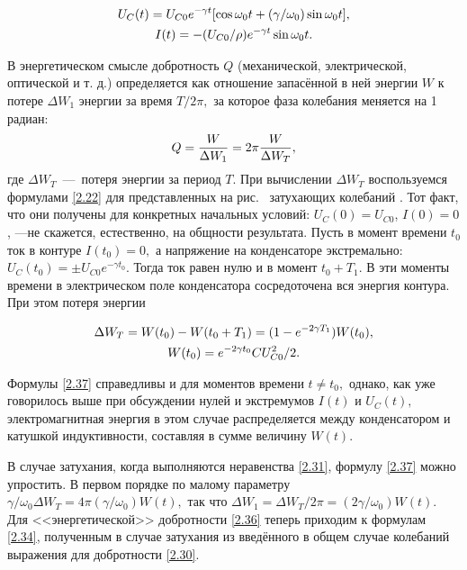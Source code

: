 \begin{equation}
	\eqmark{2.35}
		\begin{gathered}[c]
			U_C(t)=U_{C0}e^{-\gamma t}[\cos\omega_0t+(\gamma/\omega_0)\sin\omega_0t], \\
			I(t)=-(U_{C0}/\rho)e^{-\gamma t}\sin\omega_0 t.
		\end{gathered}
\end{equation}

В энергетическом смысле добротность $Q$  (механической, электрической, оптической и т. д.) определяется как отношение запасённой в ней энергии $W$ к потере $\Delta W_1$ энергии за время $T/2\pi,$ за которое фаза колебания меняется на 1 радиан:
\begin{equation}\eqmark{2.36}
Q=\dfrac{W}{\Delta W_1}=2\pi\dfrac{W}{\Delta W_T},
\end{equation}
где  $\Delta W_T$~---~потеря энергии за период $T.$ При вычислении $\Delta W_T$ воспользуемся формулами \eqref{2.22} для представленных на рис.~ затухающих колебаний . Тот факт, что они получены для конкретных начальных условий: $U_C(0)=U_{C0}$, $I(0)=0$, ---не скажется, естественно, на общности результата. Пусть в момент времени $t_0$ ток в контуре $I(t_0)=0,$ а напряжение на конденсаторе экстремально: $U_C(t_0)=\pm U_{C0}e^{-\gamma t_0}.$ Тогда ток равен нулю и в момент $t_0+T_1.$ В эти моменты времени в электрическом поле конденсатора сосредоточена вся энергия контура. При этом потеря энергии

\begin{equation}
	\eqmark{2.37}
		\begin{gathered}[c]
			 \Delta W_T = W(t_0)-W(t_0+T_1)=(1-e^{-2\gamma T_1})W(t_0), \\
			 W(t_0) = e^{-2\gamma t_0}CU_{C0}^2/2.	
		\end{gathered}
\end{equation}

Формулы \eqref{2.37} справедливы и для моментов времени $t\ne t_0,$ однако, как уже говорилось выше при обсуждении нулей и экстремумов $I(t)$ и $U_C(t),$ электромагнитная энергия в этом случае распределяется между конденсатором и катушкой индуктивности, составляя в сумме величину $W(t).$

В случае  затухания, когда выполняются неравенства \eqref{2.31}, формулу \eqref{2.37} можно упростить. В первом порядке по малому параметру $\gamma/\omega_0 \Delta W_T=4\pi(\gamma/\omega_0)W(t),$ так что $\Delta W_1=\Delta W_T/2\pi=(2\gamma/\omega_0)W(t).$ Для <<энергетической>> добротности \eqref{2.36} теперь приходим к формулам \eqref{2.34}, полученным в случае  затухания из введённого в общем случае  колебаний выражения для добротности \eqref{2.30}.

